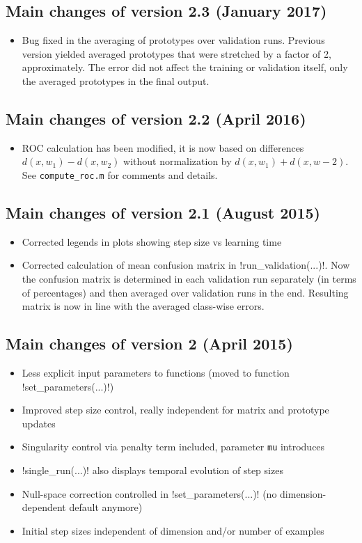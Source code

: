 \documentclass[a4paper,10pt]{article}
\begin{document}
\subsection*{Main changes of version 2.3 (January 2017)}
\begin{itemize}[label=-]
\item Bug fixed in the averaging of prototypes over validation runs. Previous version yielded averaged prototypes that were stretched by a factor of 2, approximately. The error did not affect the training or validation itself, only the averaged prototypes in the final output.
\end{itemize}

\subsection*{Main changes of version 2.2 (April 2016)}
\begin{itemize}[label=-]
\item ROC calculation has been modified, it is now based on differences $d(x, w_1) - d(x, w_2)$ without normalization by $d(x, w_1) + d(x, w-2)$. See {\tt compute\_roc.m} for comments and details.
\end{itemize}

\subsection*{Main changes of version 2.1 (August 2015)}
\begin{itemize}[label=-]
\item Corrected legends in plots showing step size vs learning time
\item Corrected calculation of mean confusion matrix in \mat!run_validation(...)!. Now the confusion matrix is determined in each validation run separately (in terms of percentages) and then averaged over validation runs in the end. Resulting matrix is now in line with the averaged class-wise errors.
\end{itemize}

\subsection*{Main changes of version 2 (April 2015)}
\begin{itemize}[label=-]
\item Less explicit input parameters to functions (moved to function \mat!set_parameters(...)!)
\item Improved step size control, really independent for matrix and prototype updates
\item Singularity control via penalty term included, parameter {\tt mu} introduces
\item \mat!single_run(...)! also displays temporal evolution of step sizes
\item Null-space correction controlled in \mat!set_parameters(...)! (no dimension-dependent default anymore)
\item Initial step sizes independent of dimension and/or number of examples
\end{itemize}
\end{document}
